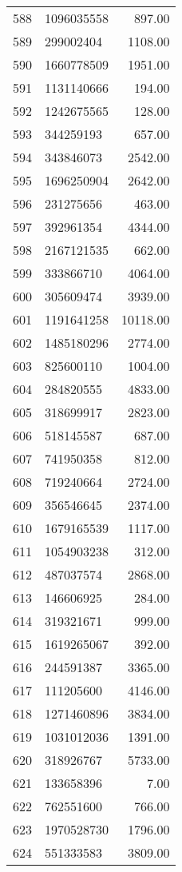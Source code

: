 \begin{table}[ht]
\begin{tabular}{rlr}
  588 & 1096035558 & 897.00 \\ 
  589 & 299002404 & 1108.00 \\ 
  590 & 1660778509 & 1951.00 \\ 
  591 & 1131140666 & 194.00 \\ 
  592 & 1242675565 & 128.00 \\ 
  593 & 344259193 & 657.00 \\ 
  594 & 343846073 & 2542.00 \\ 
  595 & 1696250904 & 2642.00 \\ 
  596 & 231275656 & 463.00 \\ 
  597 & 392961354 & 4344.00 \\ 
  598 & 2167121535 & 662.00 \\ 
  599 & 333866710 & 4064.00 \\ 
  600 & 305609474 & 3939.00 \\ 
  601 & 1191641258 & 10118.00 \\ 
  602 & 1485180296 & 2774.00 \\ 
  603 & 825600110 & 1004.00 \\ 
  604 & 284820555 & 4833.00 \\ 
  605 & 318699917 & 2823.00 \\ 
  606 & 518145587 & 687.00 \\ 
  607 & 741950358 & 812.00 \\ 
  608 & 719240664 & 2724.00 \\ 
  609 & 356546645 & 2374.00 \\ 
  610 & 1679165539 & 1117.00 \\ 
  611 & 1054903238 & 312.00 \\ 
  612 & 487037574 & 2868.00 \\ 
  613 & 146606925 & 284.00 \\ 
  614 & 319321671 & 999.00 \\ 
  615 & 1619265067 & 392.00 \\ 
  616 & 244591387 & 3365.00 \\ 
  617 & 111205600 & 4146.00 \\ 
  618 & 1271460896 & 3834.00 \\ 
  619 & 1031012036 & 1391.00 \\ 
  620 & 318926767 & 5733.00 \\ 
  621 & 133658396 & 7.00 \\ 
  622 & 762551600 & 766.00 \\ 
  623 & 1970528730 & 1796.00 \\ 
  624 & 551333583 & 3809.00 \\ 

\end{tabular}
\end{table}
